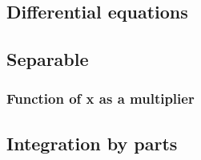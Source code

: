 \documentclass[12pt, a4paper]{article}
\begin{document}
    
    \maketitle

    \newpage

    \tableofcontents

    \newpage

    \begin{center}

    \section{Differential equations}

    \newpage

    \subsection{Separable}

    \subsubsection{Function of x as a multiplier}

    


    \subsection{Integration by parts}

    

    \end{center}
    
\end{document}
